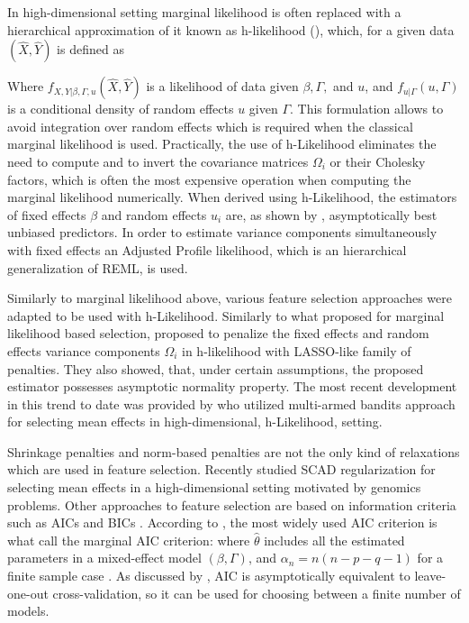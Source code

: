 \documentclass[11pt,letterpaper]{article}
\numberwithin{equation}{section} %
\numberwithin{figure}{section} %
\numberwithin{table}{section} %
\begin{document}
  In high-dimensional setting marginal likelihood is often replaced with a hierarchical approximation of it known as h-likelihood (\cite{Lee1996}), which, for a given data $(\hat{X}, \hat{Y})$ is defined as
  
  
  Where $f_{X, Y | \beta, \Gamma, u}(\hat{X}, \hat{Y})$ is a likelihood of data given $\beta, \Gamma,$ and $u$, and $f_{u|\Gamma}(u, \Gamma)$ is a conditional density of random effects $u$ given $\Gamma$. This formulation allows to avoid integration over random effects which is required when the classical marginal likelihood is used. Practically, the use of h-Likelihood eliminates the need to compute and to invert the covariance matrices $\Omega_i$ or their Cholesky factors, which is often the most expensive operation when computing the marginal likelihood numerically. When derived using h-Likelihood, the estimators of fixed effects $\beta$ and random effects $u_i$ are, as shown by \cite{Lee1996}, asymptotically best unbiased predictors. In order to estimate variance components simultaneously with fixed effects an Adjusted Profile likelihood, which is an hierarchical generalization of REML, is used.
  
  Similarly to marginal likelihood above, various feature selection approaches were adapted to be used with h-Likelihood. Similarly to what \cite{Krishna2008} proposed for marginal likelihood based selection, \cite{Xu2015} proposed to penalize the fixed effects and random effects variance components $\Omega_i$ in h-likelihood with LASSO-like family of penalties. They also showed, that, under certain assumptions, the proposed estimator possesses asymptotic normality property. The most recent development in this trend to date was provided by \cite{Xie2020} who utilized multi-armed bandits approach for selecting mean effects in high-dimensional, h-Likelihood, setting. 

  Shrinkage penalties and norm-based penalties are not the only kind of relaxations which are used in feature selection. Recently \cite{Ghosh2018} studied SCAD regularization for selecting mean effects in a high-dimensional setting motivated by genomics problems. Other approaches to feature selection are based on information criteria such as AICs and BICs \cite{Jones2011}. According to \cite{Muller2013}, the most widely used AIC criterion is what \cite{Vaida2005} call the marginal AIC criterion:
  where $\hat\theta$ includes all the estimated parameters in a mixed-effect model $(\beta, \Gamma)$, and $\alpha_n = n(n-p-q-1)$ for a finite sample case \cite{Sugiura1978}. As discussed by \cite{Fang2011}, AIC is asymptotically equivalent to leave-one-out cross-validation, so it can be used for choosing between a finite number of models. 
    
\end{document}
